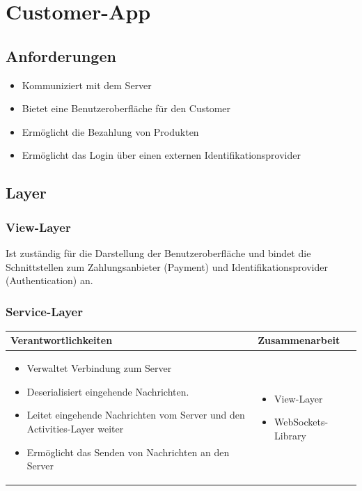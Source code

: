 {\section{Customer-App}

\subsection{Anforderungen}

\begin{itemize}
	\item Kommuniziert mit dem Server
	\item Bietet eine Benutzeroberfläche für den Customer
	\item Ermöglicht die Bezahlung von Produkten
	\item Ermöglicht das Login über einen externen Identifikationsprovider
\end{itemize}

\subsection{Layer}

\subsubsection{View-Layer}
Ist zuständig für die Darstellung der Benutzeroberfläche und bindet die Schnittstellen zum Zahlungsanbieter (Payment) und Identifikationsprovider (Authentication) an.

\subsubsection{Service-Layer}
\begin{tabular}{|p{}|p{}|} \hline
	\textbf{Verantwortlichkeiten} & \textbf{Zusammenarbeit} \\ \hline \hline
	
	\begin{itemize}
		\item Verwaltet Verbindung zum Server
		\item Deserialisiert eingehende Nachrichten.
		\item Leitet eingehende Nachrichten vom Server und den Activities-Layer weiter
		\item Ermöglicht das Senden von Nachrichten an den Server
	\end{itemize}&
	\begin{itemize}
		\item View-Layer
		\item WebSockets-Library
	\end{itemize}
	\\ \hline
\end{tabular}



}
